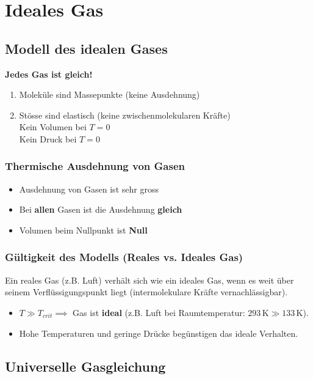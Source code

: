 
\section{Ideales Gas}

\subsection{Modell des idealen Gases}

\textbf{Jedes Gas ist gleich!}

\medskip

\begin{enumerate}
    \item Moleküle sind Massepunkte (keine Ausdehnung)
    \item Stösse sind elastisch (keine zwischenmolekularen Kräfte) \\
        Kein Volumen bei $T = 0$ \\
        Kein Druck bei $T = 0$
\end{enumerate}


\subsubsection{Thermische Ausdehnung von Gasen}

\begin{itemize}
    \item Ausdehnung von Gasen ist sehr gross
    \item Bei \textbf{allen} Gasen ist die Ausdehnung \textbf{gleich}
    \item Volumen beim Nullpunkt ist \textbf{Null} 
\end{itemize}

\subsubsection{Gültigkeit des Modells (Reales vs. Ideales Gas)}
Ein reales Gas (z.B. Luft) verhält sich wie ein ideales Gas, wenn es weit über seinem Verflüssigungspunkt liegt (intermolekulare Kräfte vernachlässigbar).
\begin{itemize}
    \item $T \gg T_{crit} \implies$ Gas ist \textbf{ideal} (z.B. Luft bei Raumtemperatur: $293\,\text{K} \gg 133\,\text{K}$).
    \item Hohe Temperaturen und geringe Drücke begünstigen das ideale Verhalten.
\end{itemize}

\subsection{Universelle Gasgleichung}

